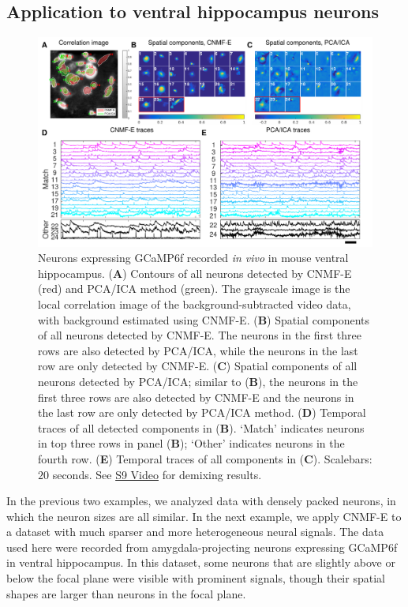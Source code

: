 \documentclass[9pt,lineno]{elife}
\begin{document}
\subsection{Application to ventral hippocampus neurons}

\begin{figure}[!t]
  \centering
  \includegraphics[width=1\textwidth]{Fig_HIPPOCAMPUS.pdf}
  \caption{Neurons expressing GCaMP6f recorded \emph{in vivo} in mouse ventral hippocampus. (\textbf{A}) Contours of all neurons detected by CNMF-E (red) and PCA/ICA method (green). The grayscale image is the local correlation image of the background-subtracted video data, with background estimated using CNMF-E. (\textbf{B}) Spatial components of all neurons detected by CNMF-E. The neurons in the first three rows are also detected by PCA/ICA, while the neurons in the last row are only detected by CNMF-E. (\textbf{C}) Spatial components of all neurons detected by PCA/ICA; similar to (\textbf{B}), the neurons in the first three rows are also detected by CNMF-E and the neurons in the last row are only detected by PCA/ICA method. (\textbf{D}) Temporal traces of all detected components in (\textbf{B}). `Match' indicates neurons in top three rows in panel (\textbf{B}); `Other' indicates neurons in the fourth row. (\textbf{E}) Temporal traces of all components in (\textbf{C}). Scalebars: $20$ seconds.  See \href{http://www.columbia.edu/~pz2230/videos/sparse_demixing.mp4}{S9 Video} for demixing results.
}
  \label{fig:sparse}\end{figure}
 
In the previous two examples, we analyzed data with densely packed neurons, in which the neuron sizes are all similar. In the next example, we apply CNMF-E to a dataset with much sparser and more heterogeneous neural signals. The data used here were recorded from amygdala-projecting neurons expressing GCaMP6f in ventral hippocampus. In this dataset, some neurons that are slightly above or below the focal plane were visible with prominent signals, though their spatial shapes are larger than neurons in the focal plane. 
\end{document}

